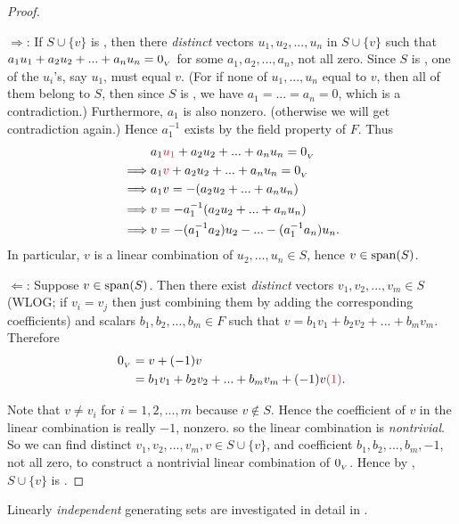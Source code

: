 \begin{proof}\ 

\(\Longrightarrow\):
If \(S \cup \{ v \}\) is \LDP{}, then there \emph{distinct} vectors \(u_1, u_2, ..., u_n\) in \(S \cup \{ v \}\) such that \(a_1 u_1 + a_2 u_2 + ... + a_n u_n = 0_{_V}\) for some \(a_1, a_2, ... , a_n\), not all zero.
Since \(S\) is \LID{}, one of the \(u_i\)'s, say \(u_1\), must equal \(v\).
(For if none of \(u_1, ..., u_n\) equal to \(v\), then all of them belong to \(S\), then since \(S\) is \LID{}, we have \(a_1 = ... = a_n = 0\), which is a contradiction.)
Furthermore, \(a_1\) is also nonzero. (otherwise we will get contradiction again.)
Hence \(a_1^{-1}\) exists by the field property of \(F\).
Thus
\begin{align*}
             & a_1 \RED{u_1} + a_2 u_2 + ... + a_n u_n = \OV \\
    \implies & a_1 \RED{v} + a_2 u_2 + ... + a_n u_n = \OV \\
    \implies & a_1 v = -(a_2 u_2 + ... + a_n u_n) \\
    \implies & v = -a_1^{-1}(a_2 u_2 + ... + a_n u_n) \\
    \implies & v = -(a_1^{-1} a_2) u_2 - ... - (a_1^{-1} a_n) u_n.
\end{align*}
In particular, \(v\) is a linear combination of \(u_2, ..., u_n \in S\), hence \(v \in \operatorname{span}(S)\).

\(\Longleftarrow\):
Suppose \(v \in \operatorname{span}(S)\).
Then there exist \emph{distinct} vectors \(v_1, v_2, ..., v_m \in S\)
(WLOG; if \(v_i = v_j\) then just combining them by adding the corresponding coefficients) 
and scalars \(b_1, b_2, ..., b_m \in F\) such that \(v = b_1 v_1 + b_2 v_2 + ... + b_m v_m\).
Therefore
\begin{align*}
    \OV & = v + (-1)v \\
      & = b_1 v_1 + b_2 v_2 + ... + b_m v_m + (-1)v \MAROON{(1)}.
\end{align*}
    
Note that \(v \ne v_i\) for \(i = 1, 2, ..., m\) because \(v \notin S\).
Hence the coefficient of \(v\) in the linear combination  is really \(-1\), nonzero.
so the linear combination is \emph{nontrivial}.
So we can find distinct \(v_1, v_2, ..., v_m, v \in S \cup \{ v \}\), and coefficient \(b_1, b_2, ..., b_m, -1\), not all zero, to construct a nontrivial linear combination of \(0_{_V}\).
Hence by , \(S \cup \{ v \}\) is \LDP{}.
\end{proof}

\begin{note}
Linearly \emph{independent} generating sets are investigated in detail in .
\end{note}

